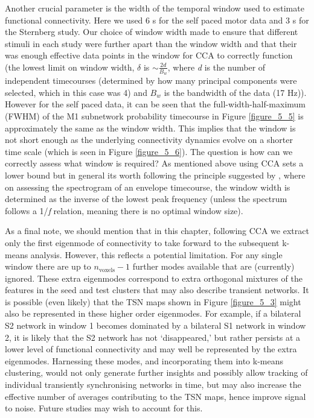 Another crucial parameter is the width of the temporal window used to estimate functional connectivity. Here we used 6 s for the self paced motor data and 3 s for the Sternberg study. Our choice of window width made to ensure that different stimuli in each study were further apart than the window width and that their was enough effective data points in the window for CCA to correctly function (the lowest limit on window width, $\delta$ is $\sim \frac{2d}{B_w}$, where \textit{d} is the number of independent timecourses (determined by how many principal components were selected, which in this case was 4) and $B_w$ is the bandwidth of the data (17 Hz)). However for the self paced data, it can be seen that the full-width-half-maximum (FWHM) of the M1 subnetwork probability timecourse in Figure \ref{figure_5_5} is approximately the same as the window width. This implies that the window is not short enough as the underlying connectivity dynamics evolve on a shorter time scale (which is seen in Figure \ref{figure_5_6}). The question is how can we correctly assess what window is required? As mentioned above using CCA sets a lower bound but in general its worth following the principle suggested by \cite{Leonardi2015}, where on assessing the spectrogram of an envelope timecourse, the window width is determined as the inverse of the lowest peak frequency (unless the spectrum follows a 1/\textit{f} relation, meaning there is no optimal window size). 

As a final note, we should mention that in this chapter, following CCA we extract only the first eigenmode of connectivity to take forward to the subsequent k-means analysis. However, this reflects a potential limitation. For any single window there are up to $n_\text{voxels}-1$ further modes available that are (currently) ignored. These extra eigenmodes correspond to extra orthogonal mixtures of the features in the seed and test clusters that may also describe transient networks. It is possible (even likely) that the TSN maps shown in Figure \ref{figure_5_3} might also be represented in these higher order eigenmodes. For example, if a bilateral S2 network in window 1 becomes dominated by a bilateral S1 network in window 2, it is likely that the S2 network has not ‘disappeared,’ but rather persists at a lower level of functional connectivity and may well be represented by the extra eigenmodes. Harnessing these modes, and incorporating them into k-means clustering, would not only generate further insights and possibly allow tracking of individual transiently synchronising networks in time, but may also increase the effective number of averages contributing to the TSN maps, hence improve signal to noise. Future studies may wish to account for this.

